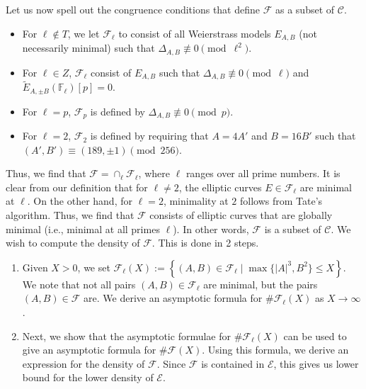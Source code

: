 \documentclass[12pt]{amsart}
\newcommand{\cF}{\mathcal{F}}
\newcommand{\cE}{\mathcal{E}}
\newcommand{\F}{\mathbb{F}}
\newcommand{\cC}{\mathcal{C}}
\newcommand{\op}[1]{\operatorname{#1}}
\numberwithin{equation}{section}
\begin{document}
\par Let us now spell out the congruence conditions that define $\cF$ as a subset of $\cC$.
\begin{itemize}
    \item For $\ell\notin T$, we let $\cF_\ell$ to consist of all Weierstrass models $E_{A,B}$ (not necessarily minimal) such that $\Delta_{A,B}\not\equiv 0\pmod{\ell^2}$. 
    \item For $\ell\in Z$, $\cF_\ell$ consist of $E_{A,B}$ such that $\Delta_{A,B}\not \equiv 0\pmod{\ell}$ and $\widetilde{E}_{A,\pm B}(\F_\ell)[p]=0$. 
    \item For $\ell=p$, $\cF_p$ is defined by $\Delta_{A,B}\not\equiv 0\pmod{p}$. 
    \item For $\ell=2$, $\cF_2$ is defined by requiring that $A=4A'$ and $B=16B'$ such that $(A', B')\equiv (189, \pm 1)\pmod{256}$.
\end{itemize}
 Thus, we find that $\cF=\cap_\ell \cF_\ell$, where $\ell$ ranges over all prime numbers. It is clear from our definition that for $\ell\neq 2$, the elliptic curves $E\in \cF_\ell$ are minimal at $\ell$. On the other hand, for $\ell=2$, minimality at $2$ follows from Tate's algorithm. Thus, we find that $\cF$ consists of elliptic curves that are globally minimal (i.e., minimal at all primes $\ell$). In other words, $\cF$ is a subset of $\cC$. We wish to compute the density of $\cF$. This is done in 2 steps. 
\begin{enumerate}
    \item Given $X>0$, we set $\cF_\ell(X):=\left\{(A, B)\in \cF_\ell\mid \op{max}\{|A|^3, B^2\}\leq X\right\}$. We note that not all pairs $(A, B)\in \cF_\ell$ are minimal, but the pairs $(A, B)\in \cF$ are. We derive an asymptotic formula for $\# \cF_\ell(X)$ as $X\rightarrow \infty$. 
    \item Next, we show that the asymptotic formulae for $\#\cF_\ell(X)$ can be used to give an asymptotic formula for $\#\cF(X)$. Using this formula, we derive an expression for the density of $\cF$. Since $\cF$ is contained in $\cE$, this gives us lower bound for the lower density of $\cE$.
\end{enumerate}
\end{document}
